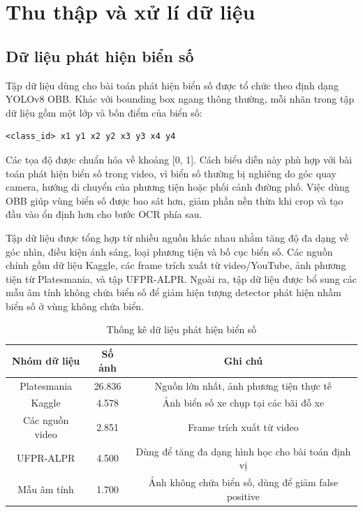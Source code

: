 \documentclass[../DoAn.tex]{subfiles}
\begin{document}
\section{Thu thập và xử lí dữ liệu}
\label{section:4.data}
\subsection{Dữ liệu phát hiện biển số}
\label{subsection:4.data.1}

Tập dữ liệu dùng cho bài toán phát hiện biển số được tổ chức theo định dạng YOLOv8 OBB. Khác với bounding box ngang thông thường, mỗi nhãn trong tập dữ liệu gồm một lớp và bốn điểm của biển số:

\begin{verbatim}
<class_id> x1 y1 x2 y2 x3 y3 x4 y4
\end{verbatim}

Các tọa độ được chuẩn hóa về khoảng [0, 1]. Cách biểu diễn này phù hợp với bài toán phát hiện biển số trong video, vì biển số thường bị nghiêng do góc quay camera, hướng di chuyển của phương tiện hoặc phối cảnh đường phố. Việc dùng OBB giúp vùng biển số được bao sát hơn, giảm phần nền thừa khi crop và tạo đầu vào ổn định hơn cho bước OCR phía sau.

Tập dữ liệu được tổng hợp từ nhiều nguồn khác nhau nhằm tăng độ đa dạng về góc nhìn, điều kiện ánh sáng, loại phương tiện và bố cục biển số. Các nguồn chính gồm dữ liệu Kaggle, các frame trích xuất từ video/YouTube, ảnh phương tiện từ Platesmania, và tập UFPR-ALPR. Ngoài ra, tập dữ liệu được bổ sung các mẫu âm tính không chứa biển số để giảm hiện tượng detector phát hiện nhầm biển số ở vùng không chứa biển.

\begin{table}[htbp]
\centering
\caption{Thống kê dữ liệu phát hiện biển số}

\begin{tabular}{|c|c|c|}
\hline
Nhóm dữ liệu & Số ảnh & Ghi chú \\
\hline
Platesmania & 26.836 & Nguồn lớn nhất, ảnh phương tiện thực tế \\
Kaggle & 4.578 & Ảnh biển số xe chụp tại các bãi đỗ xe \\
Các nguồn video & 2.851 & Frame trích xuất từ video \\
UFPR-ALPR & 4.500 & Dùng để tăng đa dạng hình học cho bài toán định vị \\
Mẫu âm tính & 1.700 & Ảnh không chứa biển số, dùng để giảm false positive \\
\hline
\end{tabular}
\end{table}
\end{document}
